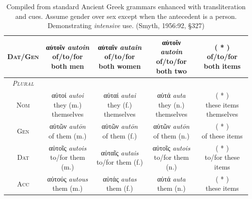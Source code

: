 \documentclass[10pt,a4paper,notitlepage]{article}
\newcommand{\tsc}[1]{\textsc{#1}}
\newcommand*{\grc}[1]{\fontspec{Inter}#1\rmfamily}
\newcommand{\trc}[1]{\textit{\fontspec{Tinos}#1}}
\begin{document}
\begin{table}[H]
\begin{tabular}{c|ccc|c}
            \tsc{Dat/Gen} & \makecell{\grc{αὐτοῖν} \trc{autoin} \\ \small of/to/for both men} & \makecell{\grc{αὐταῖν} \trc{autain} \\ \small of/to/for both women} & \makecell{\grc{αὐτοῖν} \trc{autoin} \\ \small of/to/for both two} & \makecell{( * ) \\ \small of/to/for both items} \\
            \hline
            \emph{\tsc{Plural}} & & & & \\
            \tsc{Nom} & \makecell{\grc{αὐτοί} \trc{autoi} \\ \small they (m.) themselves} & \makecell{\grc{αὐταί} \trc{autai} \\ \small they (f.) themselves} & \makecell{\grc{αὐτά} \trc{auta} \\ \small they (n.) themselves} & \makecell{( * ) \\ \small these items themselves} \\
            \tsc{Gen} & \makecell{\grc{αὐτῶν} \trc{autōn} \\ \small of them (m.)} & \makecell{\grc{αὐτῶν} \trc{autōn} \\ \small of them (f.)} & \makecell{\grc{αὐτῶν} \trc{autōn} \\ \small of them (n.)} & \makecell{( * ) \\ \small of these items} \\
            \tsc{Dat} & \makecell{\grc{αὐτοῖς} \trc{autois} \\ \small to/for them (m.)} & \makecell{\grc{αὐταῖς} \trc{autais}\\ \small to/for them (f.)} & \makecell{\grc{αὐτοῖς} \trc{autois} \\ \small to/for them (n.)} & \makecell{( * ) \\ \small to/for these items} \\
            \tsc{Acc} & \makecell{\grc{αὐτούς} \trc{autous} \\ \small them (m.)} & \makecell{\grc{αὐτάς} \trc{autas} \\ \small them (f.)} & \makecell{\grc{αὐτά} \trc{auta} \\ \small them (n.)} & \makecell{( * ) \\ \small these items} \\
        \end{tabular}
         \caption{Compiled from standard Ancient Greek grammars enhanced with transliteration and cues.
            Assume gender over sex except when the antecedent is a person. Demonstrating \emph{intensive} use.
             (Smyth, 1956:92, \S327)}
     \end{table}
\end{document}
